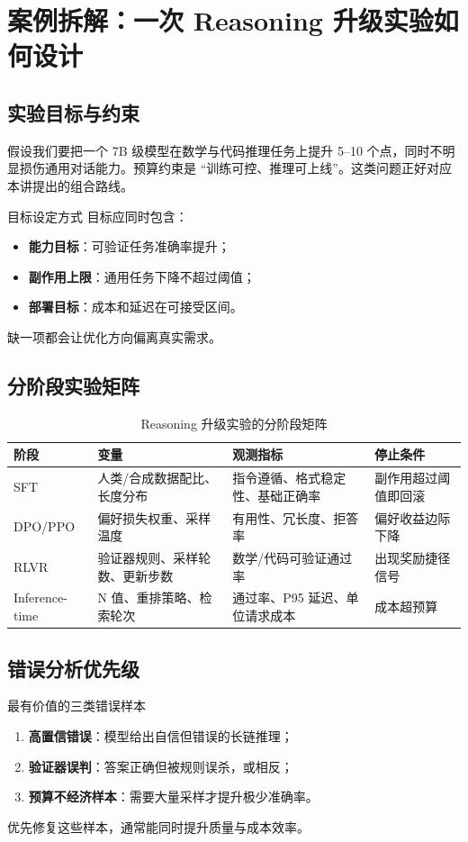 \section{案例拆解：一次 Reasoning 升级实验如何设计}

\subsection{实验目标与约束}
假设我们要把一个 7B 级模型在数学与代码推理任务上提升 5--10 个点，同时不明显损伤通用对话能力。预算约束是 ``训练可控、推理可上线''。这类问题正好对应本讲提出的组合路线。

\begin{importantbox}{目标设定方式}
目标应同时包含：
\begin{itemize}
    \item \textbf{能力目标}：可验证任务准确率提升；
    \item \textbf{副作用上限}：通用任务下降不超过阈值；
    \item \textbf{部署目标}：成本和延迟在可接受区间。
\end{itemize}
缺一项都会让优化方向偏离真实需求。
\end{importantbox}

\subsection{分阶段实验矩阵}
\begin{table}[H]
\centering
\renewcommand{\arraystretch}{1.2}
\begin{tabular}{p{2.8cm}p{3.4cm}p{3.8cm}p{3.0cm}}
\toprule
\textbf{阶段} & \textbf{变量} & \textbf{观测指标} & \textbf{停止条件} \\
\midrule
SFT & 人类/合成数据配比、长度分布 & 指令遵循、格式稳定性、基础正确率 & 副作用超过阈值即回滚 \\
DPO/PPO & 偏好损失权重、采样温度 & 有用性、冗长度、拒答率 & 偏好收益边际下降 \\
RLVR & 验证器规则、采样轮数、更新步数 & 数学/代码可验证通过率 & 出现奖励捷径信号 \\
Inference-time & N 值、重排策略、检索轮次 & 通过率、P95 延迟、单位请求成本 & 成本超预算 \\
\bottomrule
\end{tabular}
\caption{Reasoning 升级实验的分阶段矩阵}
\end{table}

\subsection{错误分析优先级}
\begin{knowledgebox}{最有价值的三类错误样本}
\begin{enumerate}
    \item \textbf{高置信错误}：模型给出自信但错误的长链推理；
    \item \textbf{验证器误判}：答案正确但被规则误杀，或相反；
    \item \textbf{预算不经济样本}：需要大量采样才提升极少准确率。
\end{enumerate}
优先修复这些样本，通常能同时提升质量与成本效率。
\end{knowledgebox}

